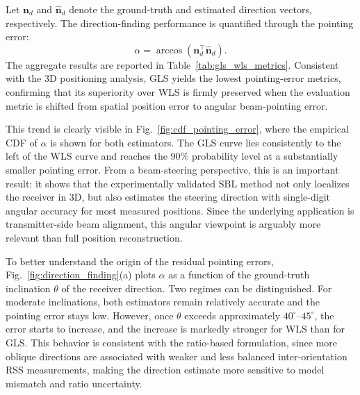 \documentclass[conference]{IEEEtran}
\begin{document}
Let $\mathbf{n}_d$ and $\hat{\mathbf{n}}_d$ denote the ground-truth and estimated direction vectors, respectively. The direction-finding performance is quantified through the pointing error:
\begin{equation}
    \alpha = \arccos\!\left(\mathbf{n}_d^\top \hat{\mathbf{n}}_d\right).
    \label{eq:pointing_error}
\end{equation}
The aggregate results are reported in Table~\ref{tab:gls_wls_metrics}. Consistent with the 3D positioning analysis, GLS yields the lowest pointing-error metrics, confirming that its superiority over WLS is firmly preserved when the evaluation metric is shifted from spatial position error to angular beam-pointing error.

This trend is clearly visible in Fig.~\ref{fig:cdf_pointing_error}, where the empirical CDF of $\alpha$ is shown for both estimators. The GLS curve lies consistently to the left of the WLS curve and reaches the $90\%$ probability level at a substantially smaller pointing error. From a beam-steering perspective, this is an important result: it shows that the experimentally validated SBL method not only localizes the receiver in 3D, but also estimates the steering direction with single-digit angular accuracy for most measured positions. Since the underlying application is transmitter-side beam alignment, this angular viewpoint is arguably more relevant than full position reconstruction.

To better understand the origin of the residual pointing errors, Fig.~\ref{fig:direction_finding}(a) plots $\alpha$ as a function of the ground-truth inclination $\theta$ of the receiver direction. Two regimes can be distinguished. For moderate inclinations, both estimators remain relatively accurate and the pointing error stays low. However, once $\theta$ exceeds approximately $40^\circ$--$45^\circ$, the error starts to increase, and the increase is markedly stronger for WLS than for GLS. This behavior is consistent with the ratio-based formulation, since more oblique directions are associated with weaker and less balanced inter-orientation RSS measurements, making the direction estimate more sensitive to model mismatch and ratio uncertainty.
\end{document}
